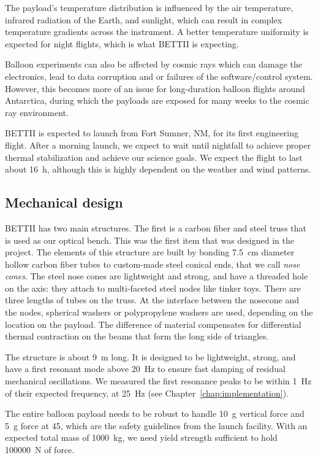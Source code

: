 The payload's temperature distribution is influenced by the air temperature, infrared radiation of the Earth, and sunlight, which can result in complex temperature gradients across the instrument. A better temperature uniformity is expected for night flights, which is what BETTII is expecting.

Balloon experiments can also be affected by cosmic rays which can damage the electronics, lead to data corruption and or failures of the software/control system. However, this becomes more of an issue for long-duration balloon flights around Antarctica, during which the payloads are exposed for many weeks to the cosmic ray environment.

BETTII is expected to launch from Fort Sumner, NM, for its first engineering flight. After a morning launch, we expect to wait until nightfall to achieve proper thermal stabilization and achieve our science goals. We expect the flight to last about \SI{16}{\hour}, although this is highly dependent on the weather and wind patterns.


\subsection{Mechanical design}

BETTII has two main structures. The first is a carbon fiber and steel truss that is used as our optical bench. This was the first item that was designed in the project. The elements of this structure are built by bonding \SI{7.5}{\centi\meter} diameter hollow carbon fiber tubes to custom-made steel conical ends, that we call \textit{nose cones}. The steel nose cones are lightweight and strong, and have a threaded hole on the axis: they attach to multi-faceted steel nodes like tinker toys. There are three lengths of tubes on the truss. At the interface between the nosecone and the nodes, spherical washers or polypropylene washers are used, depending on the location on the payload. The difference of material compensates for differential thermal contraction on the beams that form the long side of triangles.

The structure is about \SI{9}{\meter} long. It is designed to be lightweight, strong, and have a first resonant mode above \SI{20}{\hertz} to ensure fast damping of residual mechanical oscillations. We measured the first resonance peaks to be within \SI{1}{\hertz} of their expected frequency, at \SI{25}{\hertz} (see Chapter~\ref{chap:implementation}).

The entire balloon payload needs to be robust to handle 10~g vertical force and 5~g force at \SI{45}{\deg}, which are the safety guidelines from the launch facility. With an expected total mass of \SI{1000}{\kilo\gram}, we need yield strength sufficient to hold \SI{100000}{\newton} of force. 

